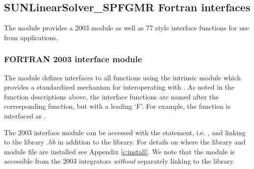 \subsection{SUNLinearSolver\_SPFGMR Fortran interfaces}
\label{ss:sunlinsol_spfgmr_fortran}

The {\sunlinsolspfgmr} module provides a {\F} 2003 module as well as {\F} 77
style interface functions for use from {\F} applications.

\subsubsection*{FORTRAN 2003 interface module}
The  {\F} module defines interfaces to all
{\sunlinsolspfgmr} {\CC} functions using the intrinsic 
module which provides a standardized mechanism for interoperating with {\CC}. As
noted in the {\CC} function descriptions above, the interface functions are
named after the corresponding {\CC} function, but with a leading `F'. For
example, the function  is interfaced as
.

The {\F} 2003 {\sunlinsolspfgmr} interface module can be accessed with the 
statement, i.e. , and linking to the library
.{\em lib} in addition to the {\CC} library.
For details on where the library and module file \newline
{} are installed see Appendix \ref{c:install}.
We note that the module is accessible from the {\F} 2003 {\sundials} integrators
\textit{without} separately linking to the \newline
{} library.

